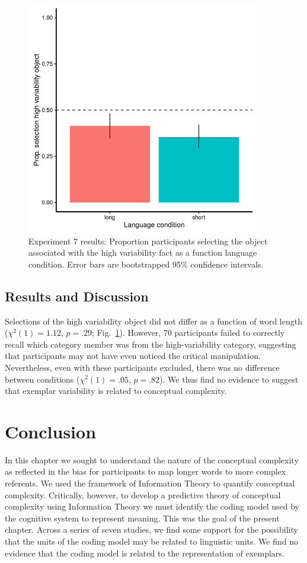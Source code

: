   \begin{figure}[t!]
 \begin{center}
  \includegraphics[width=4in]{figs/var_results.pdf}
  \caption{\label{fig:var_plot} Experiment 7 results: Proportion participants selecting the object associated with the high variability fact as a function language condition.  Error bars are bootstrapped 95\% confidence intervals.}
 \end{center}
\end{figure}


\subsection{Results and Discussion}

Selections of the high variability object did not differ as a function of word length (${\chi}^2$$(1) = 1.12$, $p = .29$; Fig.\ \ref{fig:var_plot}). However, 70 participants failed to correctly recall which category member was from the high-variability category, suggesting that participants may not have even noticed the critical manipulation. Nevertheless, even with these participants excluded, there was no difference between conditions (${\chi}^2$$(1) = .05$, $p = .82$). We thus find no evidence to suggest that exemplar variability is related to conceptual complexity.



\section{Conclusion}
In this chapter we sought to understand the nature of the conceptual complexity as reflected in the bias for participants to map longer words to more complex  referents. We used the framework of  Information Theory to quantify conceptual complexity. Critically, however, to develop a predictive theory of conceptual complexity using Information Theory we must identify the  coding model used by the cognitive system to represent meaning. This was the goal of the present chapter.  Across a series of seven studies, we find some support for the possibility that the units of the coding model may be related to linguistic units. We find no evidence that the coding model is related to the representation of exemplars. 

